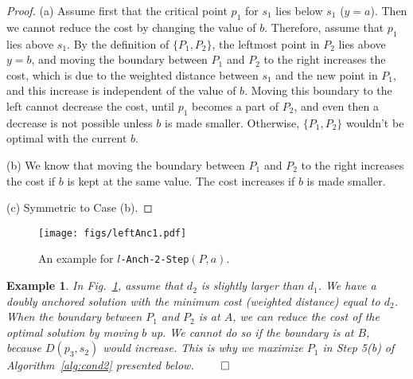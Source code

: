 \documentclass[preprint,10pt]{elsarticle}
\newcommand{\QED}{\hfill$\qed$}
\newtheorem{example}{Example}
\begin{document}
\begin{proof}
(a) Assume first that the critical point $p_1$ for $s_1$ lies below $s_1$ ($y=a$).
Then we cannot reduce the cost by changing the value of $b$.
Therefore, assume that $p_1$ lies above $s_1$.
By the definition of $\{P_1,P_2\}$, the leftmost point in $P_2$ lies above $y=b$,
and moving the boundary between $P_1$ and $P_2$ to the right increases the cost,
which is due to the weighted distance between $s_1$ and the new point in $P_1$,
and this increase is independent of the value of $b$.
Moving this boundary to the left cannot decrease the cost,
until $p_1$ becomes a part of $P_2$,
and even then a decrease is not possible unless $b$ is made smaller.
Otherwise, $\{P_1,P_2\}$ wouldn't be optimal with the current $b$.

(b) We know that moving the boundary between $P_1$ and $P_2$ to the right increases the cost
 if $b$ is kept at the same value.
The cost increases if $b$ is made smaller.

(c) Symmetric to Case (b).
\end{proof}

\begin{figure}[ht]
\centering
\texttt{[image: figs/leftAnc1.pdf]}
\hspace{2mm}
\caption{An example for {\tt $l$-Anch-2-Step}$(P,a)$.
}
\label{fig:leftAnc}
\end{figure}
\begin{example}
In Fig.~\ref{fig:leftAnc},
assume that $d_2$ is slightly larger than $d_1$.
We have a doubly anchored solution with the minimum cost (weighted distance)
equal to $d_2$.
When the boundary between $P_1$ and $P_2$ is at $A$,
we can reduce the cost of the optimal solution by moving $b$ up.
We cannot do so if the boundary is at $B$,
because $D(p_3, s_2)$ would increase.
This is why we maximize $P_1$ in Step 5(b) of Algorithm~\ref{alg:cond2}
presented below.
\QED
\end{example}
\end{document}
